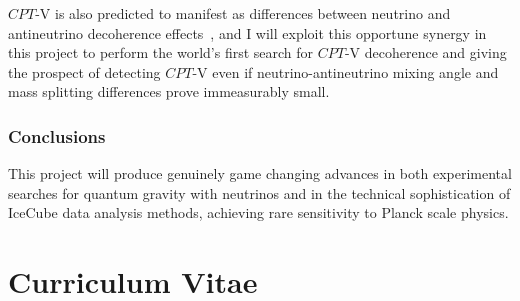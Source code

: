 \documentclass[a4paper,11pt]{article}
\begin{document}

$CPT$-V is also predicted to manifest as differences between neutrino and antineutrino decoherence effects~\cite{Mavromatos_2009, Barenboim:2004wu, Carrasco:2018sca, Buoninfante:2020iyr, Capolupo:2020myw}, and I will exploit this opportune synergy in this project to perform the world's first search for $CPT$-V decoherence and giving the prospect of detecting $CPT$-V even if neutrino-antineutrino mixing angle and mass splitting differences prove immeasurably small. \\

\subsubsection{Conclusions}


This project will produce genuinely game changing advances in both experimental searches for quantum gravity with neutrinos and in the technical sophistication of IceCube data analysis methods, achieving rare sensitivity to Planck scale physics. \\






\newpage

\section{Curriculum Vitae}
\end{document}

